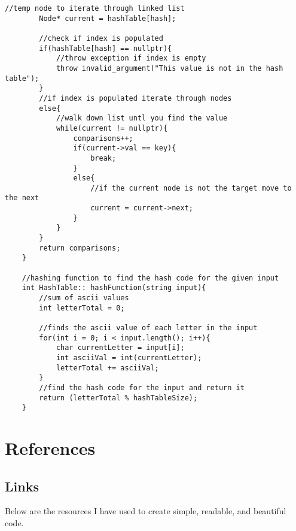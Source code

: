 \documentclass[letterpaper, 10pt,DIV=13]{scrartcl}
\numberwithin{equation}{section} %
\numberwithin{figure}{section} %
\numberwithin{table}{section} %
\begin{document}
\begin{lstlisting}[frame=single, ]
        //temp node to iterate through linked list
        Node* current = hashTable[hash];
    
        //check if index is populated
        if(hashTable[hash] == nullptr){
            //throw exception if index is empty
            throw invalid_argument("This value is not in the hash table");
        }
        //if index is populated iterate through nodes
        else{
            //walk down list untl you find the value
            while(current != nullptr){
                comparisons++;
                if(current->val == key){
                    break;
                }
                else{
                    //if the current node is not the target move to the next
                    current = current->next;
                }
            }
        }
        return comparisons;
    }
    
    //hashing function to find the hash code for the given input
    int HashTable:: hashFunction(string input){
        //sum of ascii values
        int letterTotal = 0; 
    
        //finds the ascii value of each letter in the input
        for(int i = 0; i < input.length(); i++){
            char currentLetter = input[i];
            int asciiVal = int(currentLetter);
            letterTotal += asciiVal;
        }
        //find the hash code for the input and return it
        return (letterTotal % hashTableSize);
    }

\end{lstlisting}

\pagebreak

\section{References}

\subsection{Links}
Below are the resources I have used to create simple, readable, and beautiful code.
\end{document}
